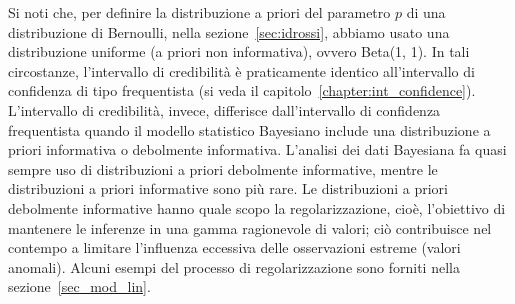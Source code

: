 Si noti che, per definire la distribuzione a priori del parametro $p$ di una distribuzione di Bernoulli, nella sezione~\ref{sec:idrossi}, abbiamo usato una distribuzione uniforme (a priori non informativa), ovvero Beta(1, 1). 
In tali circostanze, l'intervallo di credibilità è praticamente identico all'intervallo di confidenza di tipo frequentista (si veda il capitolo~\ref{chapter:int_confidence}). 
L'intervallo di credibilità, invece, differisce dall'intervallo di confidenza frequentista quando il modello statistico Bayesiano include una distribuzione a priori informativa o debolmente informativa.
L'analisi dei dati Bayesiana fa quasi sempre uso di distribuzioni a priori debolmente informative, mentre le distribuzioni a priori informative sono più rare.
Le distribuzioni a priori debolmente informative hanno quale scopo la regolarizzazione, cioè, l'obiettivo di mantenere le inferenze in una gamma ragionevole di valori; ciò contribuisce nel contempo a limitare l'influenza eccessiva delle osservazioni estreme (valori anomali).
Alcuni esempi del processo di regolarizzazione sono forniti nella sezione~\ref{sec_mod_lin}. 










